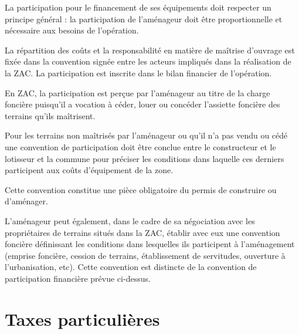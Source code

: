 	La participation pour le financement de ses équipements doit respecter un principe général : la participation de l’aménageur doit être proportionnelle et nécessaire aux besoins de l’opération.
	
	La répartition des coûts et la responsabilité en matière de maîtrise d’ouvrage est fixée dans la convention signée entre les acteurs impliqués dans la réalisation de la ZAC. La participation est inscrite dans le bilan financier de l’opération.
	
	En ZAC, la participation est perçue par l’aménageur au titre de la charge foncière puisqu’il a vocation à céder, louer ou concéder l’assiette foncière des terrains qu’ils maîtrisent.
	
	Pour les terrains non maîtrisés par l’aménageur ou qu’il n’a pas vendu ou cédé une convention de participation doit être conclue entre le constructeur et le lotisseur et la commune pour préciser les conditions dans laquelle ces derniers participent aux coûts d’équipement de la zone.
	
	Cette convention constitue une pièce obligatoire du permis de construire ou d’aménager.
	
	L’aménageur peut également, dans le cadre de sa négociation avec les propriétaires de terrains situés dans la ZAC, établir avec eux une convention foncière définissant les conditions dans lesquelles ils participent à l’aménagement (emprise foncière, cession de terrains, établissement de servitudes, ouverture à l’urbanisation, etc). Cette convention est distincte de la convention de participation financière prévue ci-dessus.

\section{Taxes particulières}
